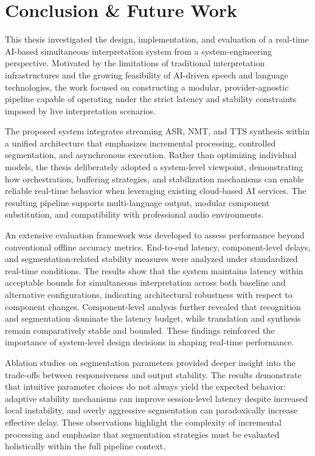 \chapter{Conclusion \& Future Work}
\label{chapter:conclusion}

This thesis investigated the design, implementation, and evaluation of a real-time AI-based simultaneous interpretation system from a system-engineering perspective. Motivated by the limitations of traditional interpretation infrastructures and the growing feasibility of AI-driven speech and language technologies, the work focused on constructing a modular, provider-agnostic pipeline capable of operating under the strict latency and stability constraints imposed by live interpretation scenarios.

The proposed system integrates streaming ASR, NMT, and TTS synthesis within a unified architecture that emphasizes incremental processing, controlled segmentation, and asynchronous execution. Rather than optimizing individual models, the thesis deliberately adopted a system-level viewpoint, demonstrating how orchestration, buffering strategies, and stabilization mechanisms can enable reliable real-time behavior when leveraging existing cloud-based AI services. The resulting pipeline supports multi-language output, modular component substitution, and compatibility with professional audio environments.

An extensive evaluation framework was developed to assess performance beyond conventional offline accuracy metrics. End-to-end latency, component-level delays, and segmentation-related stability measures were analyzed under standardized real-time conditions. The results show that the system maintains latency within acceptable bounds for simultaneous interpretation across both baseline and alternative configurations, indicating architectural robustness with respect to component changes. Component-level analysis further revealed that recognition and segmentation dominate the latency budget, while translation and synthesis remain comparatively stable and bounded. These findings reinforced the importance of system-level design decisions in shaping real-time performance.

Ablation studies on segmentation parameters provided deeper insight into the trade-offs between responsiveness and output stability. The results demonstrate that intuitive parameter choices do not always yield the expected behavior: adaptive stability mechanisms can improve session-level latency despite increased local instability, and overly aggressive segmentation can paradoxically increase effective delay. These observations highlight the complexity of incremental processing and emphasize that segmentation strategies must be evaluated holistically within the full pipeline context.


